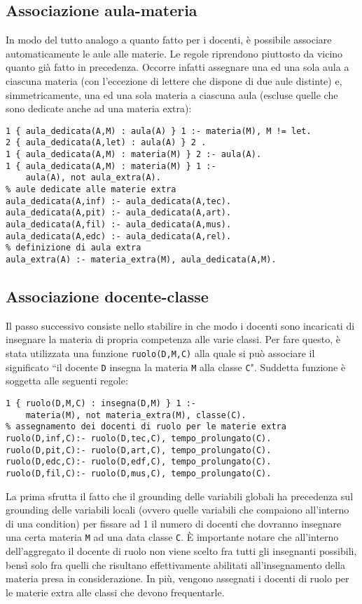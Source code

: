 \subsection{Associazione aula-materia}
\label{aula_materia}
In modo del tutto analogo a quanto fatto per i docenti, è possibile associare automaticamente le aule alle materie.
Le regole riprendono piuttosto da vicino quanto già fatto in precedenza. Occorre infatti assegnare una ed una sola aula a ciascuna materia (con l'eccezione di lettere che dispone di due aule distinte) e, simmetricamente, una ed una sola materia a ciascuna aula (escluse quelle che sono dedicate anche ad una materia extra):
\begin{lstlisting}[frame=single]
1 { aula_dedicata(A,M) : aula(A) } 1 :- materia(M), M != let.
2 { aula_dedicata(A,let) : aula(A) } 2 .
1 { aula_dedicata(A,M) : materia(M) } 2 :- aula(A).
1 { aula_dedicata(A,M) : materia(M) } 1 :-
	aula(A), not aula_extra(A).
% aule dedicate alle materie extra
aula_dedicata(A,inf) :- aula_dedicata(A,tec).
aula_dedicata(A,pit) :- aula_dedicata(A,art).
aula_dedicata(A,fil) :- aula_dedicata(A,mus).
aula_dedicata(A,edc) :- aula_dedicata(A,rel).
% definizione di aula extra
aula_extra(A) :- materia_extra(M), aula_dedicata(A,M).
\end{lstlisting}


\subsection{Associazione docente-classe}
Il passo successivo consiste nello stabilire in che modo i docenti sono incaricati di insegnare la materia di propria competenza alle varie classi. Per fare questo, è stata utilizzata una funzione \texttt{ruolo(D,M,C)} alla quale si può associare il significato ``il docente  \texttt{D} insegna la materia \texttt{M} alla classe \texttt{C}". Suddetta funzione è soggetta alle seguenti regole:
\begin{lstlisting}[frame=single]
1 { ruolo(D,M,C) : insegna(D,M) } 1 :-
	materia(M), not materia_extra(M), classe(C). 
% assegnamento dei docenti di ruolo per le materie extra
ruolo(D,inf,C):- ruolo(D,tec,C), tempo_prolungato(C). 
ruolo(D,pit,C):- ruolo(D,art,C), tempo_prolungato(C). 
ruolo(D,edc,C):- ruolo(D,edf,C), tempo_prolungato(C). 
ruolo(D,fil,C):- ruolo(D,mus,C), tempo_prolungato(C). 
\end{lstlisting}
La prima sfrutta il fatto che il grounding delle variabili globali ha precedenza sul grounding delle variabili locali (ovvero quelle variabili che compaiono all'interno di una condition) per fissare ad 1 il numero di docenti che dovranno insegnare una certa materia \texttt{M} ad una data classe \texttt{C}. È importante notare che all'interno dell'aggregato il docente di ruolo non viene scelto fra tutti gli insegnanti possibili, bensì solo fra quelli che risultano effettivamente abilitati all'insegnamento della materia presa in considerazione. In più, vengono assegnati i docenti di ruolo per le materie extra   alle classi che devono frequentarle.
 
